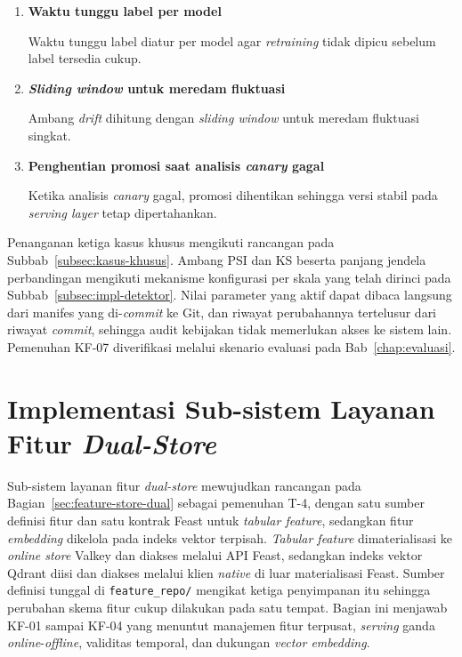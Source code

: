 \vspace{0.5em}
\begin{enumerate}
    \item \textbf{Waktu tunggu label per model}

    Waktu tunggu label diatur per model agar \textit{retraining} tidak dipicu sebelum label tersedia cukup.

    \vspace{0.5em}

    \item \textbf{\textit{Sliding window} untuk meredam fluktuasi}

    Ambang \textit{drift} dihitung dengan \textit{sliding window} untuk meredam fluktuasi singkat.

    \vspace{0.5em}

    \item \textbf{Penghentian promosi saat analisis \textit{canary} gagal}

    Ketika analisis \textit{canary} gagal, promosi dihentikan sehingga versi stabil pada \textit{serving layer} tetap dipertahankan.
\end{enumerate}

Penanganan ketiga kasus khusus mengikuti rancangan pada Subbab~\ref{subsec:kasus-khusus}. Ambang PSI dan KS beserta panjang jendela perbandingan mengikuti mekanisme konfigurasi per skala yang telah dirinci pada Subbab~\ref{subsec:impl-detektor}. Nilai parameter yang aktif dapat dibaca langsung dari manifes yang di-\textit{commit} ke Git, dan riwayat perubahannya tertelusur dari riwayat \textit{commit}, sehingga audit kebijakan tidak memerlukan akses ke sistem lain. Pemenuhan KF-07 diverifikasi melalui skenario evaluasi pada Bab~\ref{chap:evaluasi}.

\section{Implementasi Sub-sistem Layanan Fitur \textit{Dual-Store}}
\label{sec:impl-feast}

Sub-sistem layanan fitur \textit{dual-store} mewujudkan rancangan pada Bagian~\ref{sec:feature-store-dual} sebagai pemenuhan T-4, dengan satu sumber definisi fitur dan satu kontrak Feast untuk \textit{tabular feature}, sedangkan fitur \textit{embedding} dikelola pada indeks vektor terpisah. \textit{Tabular feature} dimaterialisasi ke \textit{online store} Valkey dan diakses melalui API Feast, sedangkan indeks vektor Qdrant diisi dan diakses melalui klien \textit{native} di luar materialisasi Feast. Sumber definisi tunggal di \texttt{feature\_repo/} mengikat ketiga penyimpanan itu sehingga perubahan skema fitur cukup dilakukan pada satu tempat. Bagian ini menjawab KF-01 sampai KF-04 yang menuntut manajemen fitur terpusat, \textit{serving} ganda \textit{online}-\textit{offline}, validitas temporal, dan dukungan \textit{vector embedding}.

